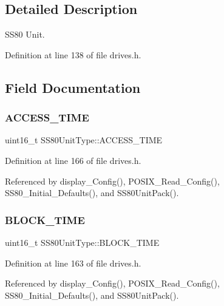 \subsection{Detailed Description}
S\+S80 Unit. 

Definition at line 138 of file drives.\+h.



\subsection{Field Documentation}
\mbox{\label{structSS80UnitType_ab43ef110f145d428fff831afc18f5e24}} 
\subsubsection{\texorpdfstring{A\+C\+C\+E\+S\+S\+\_\+\+T\+I\+ME}{ACCESS\_TIME}}
{\footnotesize\ttfamily uint16\+\_\+t S\+S80\+Unit\+Type\+::\+A\+C\+C\+E\+S\+S\+\_\+\+T\+I\+ME}



Definition at line 166 of file drives.\+h.



Referenced by display\+\_\+\+Config(), P\+O\+S\+I\+X\+\_\+\+Read\+\_\+\+Config(), S\+S80\+\_\+\+Initial\+\_\+\+Defaults(), and S\+S80\+Unit\+Pack().

\mbox{\label{structSS80UnitType_ab94c4b75c74e08e128d4802f5dec0dd5}} 
\subsubsection{\texorpdfstring{B\+L\+O\+C\+K\+\_\+\+T\+I\+ME}{BLOCK\_TIME}}
{\footnotesize\ttfamily uint16\+\_\+t S\+S80\+Unit\+Type\+::\+B\+L\+O\+C\+K\+\_\+\+T\+I\+ME}



Definition at line 163 of file drives.\+h.



Referenced by display\+\_\+\+Config(), P\+O\+S\+I\+X\+\_\+\+Read\+\_\+\+Config(), S\+S80\+\_\+\+Initial\+\_\+\+Defaults(), and S\+S80\+Unit\+Pack().


